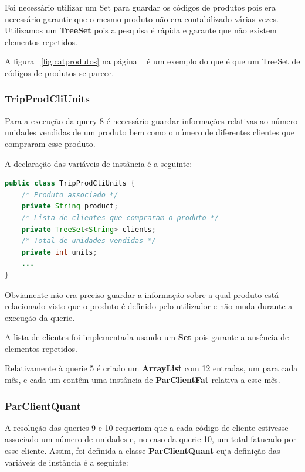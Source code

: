 \documentclass[10pt] {article}
\begin{document}
\par Foi necessário utilizar um Set para guardar os códigos de produtos pois era necessário garantir que o mesmo produto
não era contabilizado várias vezes. Utilizamos um \textbf{TreeSet} pois a pesquisa é rápida e garante que não existem
elementos repetidos.
\par A figura ~\ref{fig:catprodutos} na página ~\pageref{fig:catprodutos} é um exemplo do que é que um TreeSet de
códigos de produtos se parece.

\subsubsection{TripProdCliUnits}
\par Para a execução da query 8 é necessário guardar informações relativas ao número unidades vendidas de um produto
bem como o número de diferentes clientes que compraram esse produto.
\par A declaração das variáveis de instância é a seguinte:

\begin{lstlisting}[language=Java]
public class TripProdCliUnits {
	/* Produto associado */
	private String product;
	/* Lista de clientes que compraram o produto */
	private TreeSet<String> clients;
	/* Total de unidades vendidas */
	private int units;
	...
}
\end{lstlisting}

\par Obviamente não era preciso guardar a informação sobre a qual produto está relacionado visto que o produto é definido
pelo utilizador e não muda durante a execução da querie.
\par A lista de clientes foi implementada usando um \textbf{Set} pois garante a ausência de elementos repetidos.
\par Relativamente à querie 5 é criado um \textbf{ArrayList} com 12 entradas, um para cada mês, e cada um contêm uma
instância de \textbf{ParClientFat} relativa a esse mês.

\subsubsection{ParClientQuant}
\par A resolução das queries 9 e 10 requeriam que a cada código de cliente estivesse associado um número de unidades e,
no caso da querie 10, um total fatucado por esse cliente. Assim, foi definida a classe \textbf{ParClientQuant} cuja
definição das variáveis de instância é a seguinte:
\end{document}
